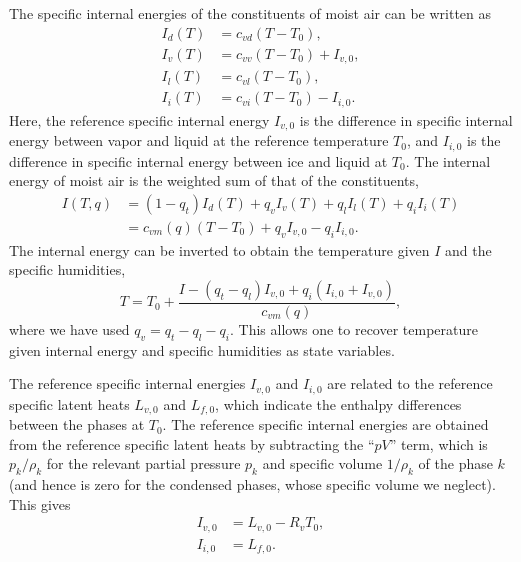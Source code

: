 \documentclass{report}
\begin{document}
The specific internal energies of the constituents of moist air can be written as
\begin{subequations}\label{e:internal_energies}
\begin{align}
I_d(T) & = c_{vd} (T - T_0),  \\
I_v(T) & = c_{vv} (T - T_0) + I_{v,0},\\
I_l(T) & = c_{vl} (T - T_0), \\
I_i(T) & = c_{vi} (T - T_0) - I_{i,0}.
\end{align}
\end{subequations}
Here, the reference specific internal energy $I_{v,0}$ is the difference in specific internal energy between vapor and liquid at the reference temperature $T_0$, and $I_{i,0}$ is the difference in specific internal energy between ice and liquid at $T_0$. The internal energy of moist air is the weighted sum of that of the constituents,
\begin{equation}
\begin{split}
     I(T, q) & = (1-q_t) I_d(T) + q_v I_v(T) + q_l I_l(T) + q_i I_i(T)\\
          & = c_{vm}(q) (T - T_0)  + q_v I_{v,0} - q_i I_{i,0}.
     \label{e:total_internal_energy}
\end{split}
\end{equation}
The internal energy can be inverted to obtain the temperature given $I$ and the specific humidities,
\begin{equation}
    T = T_0 + \frac{I - (q_t - q_l) I_{v,0} + q_i (I_{i,0} + I_{v,0})}{c_{vm}(q)},
    \label{e:temperature}
\end{equation}
where we have used $q_v = q_t - q_l - q_i$. This allows one to recover temperature given internal energy and specific humidities as state variables.

The reference specific internal energies $I_{v,0}$ and $I_{i,0}$ are related to the reference specific latent heats $L_{v,0}$ and $L_{f,0}$, which indicate the enthalpy differences between the phases at $T_0$. The reference specific internal energies are obtained from the reference specific latent heats by subtracting the ``$pV$'' term, which is $p_k/\rho_k$ for the relevant partial pressure $p_k$ and specific volume $1/\rho_k$ of the phase $k$ (and hence is zero for the condensed phases, whose specific volume we neglect). This gives
\begin{subequations}\label{e:ref_internal_energies}
\begin{align}
     I_{v,0} &= L_{v, 0} - R_v T_0,\\
     I_{i,0} &= L_{f, 0}.
\end{align}
\end{subequations}
   
\end{document}
